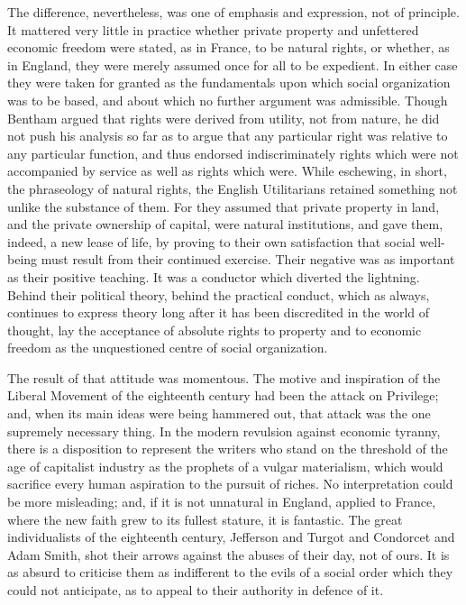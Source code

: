 \documentclass{book}
\begin{document}
The difference, nevertheless, was one of emphasis and expression, not of principle. It mattered very little in practice whether private property and unfettered economic freedom were stated, as in France, to be natural rights, or whether, as in England, they were merely assumed once for all to be expedient. In either case they were taken for granted as the fundamentals upon which social organization was to be based, and about which no further argument was admissible. Though Bentham argued that rights were derived from utility, not from nature, he did not push his analysis so far as to argue that any particular right was relative to any particular function, and thus endorsed indiscriminately rights which were not accompanied by service as well as rights which were. While eschewing, in short, the phraseology of natural rights, the English Utilitarians retained something not unlike the substance of them. For they assumed that private property in land, and the private ownership of capital, were natural institutions, and gave them, indeed, a new lease of life, by proving to their own satisfaction that social well-being must result from their continued exercise. Their negative was as important as their positive teaching. It was a conductor which diverted the lightning. Behind their political theory, behind the practical conduct, which as always, continues to express theory long after it has been discredited in the world of thought, lay the acceptance of absolute rights to property and to economic freedom as the unquestioned centre of social organization.

The result of that attitude was momentous. The motive and inspiration of the Liberal Movement of the eighteenth century had been the attack on Privilege; and, when its main ideas were being hammered out, that attack was the one supremely necessary thing. In the modern revulsion against economic tyranny, there is a disposition to represent the writers who stand on the threshold of the age of capitalist industry as the prophets of a vulgar materialism, which would sacrifice every human aspiration to the pursuit of riches. No interpretation could be more misleading; and, if it is not unnatural in England, applied to France, where the new faith grew to its fullest stature, it is fantastic. The great individualists of the eighteenth century, Jefferson and Turgot and Condorcet and Adam Smith, shot their arrows against the abuses of their day, not of ours. It is as absurd to criticise them as indifferent to the evils of a social order which they could not anticipate, as to appeal to their authority in defence of it.
\end{document}
